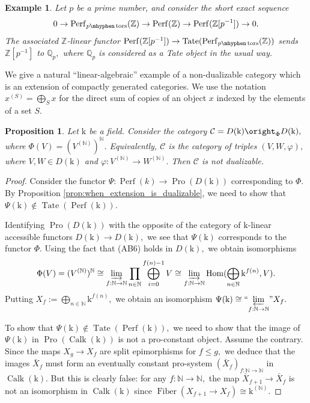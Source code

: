 \documentclass[11pt,leqno]{amsart}
\newtheorem{prop}[theo]{Proposition}
\newtheorem{example}[theo]{Example}
\numberwithin{equation}{section}
\def\N{\mathbb{N}}
\def\Z{\mathbb{Z}}
\def\Q{\mathbb{Q}}
\def\Hom{\operatorname{Hom}}
\newcommand{\hy}{\mhyphen}
\newcommand{\indlim}[1][]{\mathop{\varinjlim}\limits_{#1}}
\newcommand{\prolim}[1][]{\mathop{\varprojlim}\limits_{#1}}
\newcommand{\proolim}[1][]{{``{\prolim[#1]}"}}
\newcommand{\prodd}[1][]{\mathop{\prod}\limits_{#1}}
\newcommand{\Tate}{\operatorname{Tate}}
\newcommand{\Fiber}{\operatorname{Fiber}}
\newcommand{\mk}{\mathrm k}
\newcommand{\cC}{{\mathcal C}}
\newcommand{\Perf}{\operatorname{Perf}}
\newcommand{\Pro}{\operatorname{Pro}}
\newcommand{\Calk}{\operatorname{Calk}}
\newcommand{\tors}{\operatorname{tors}}
\begin{document}
\begin{example} Let $p$ be a prime number, and consider the short exact sequence
$$0\to\Perf_{p\hy\tors}(\Z)\to\Perf(\Z)\to\Perf(\Z[p^{-1}])\to 0.$$
The associated $\Z$-linear functor $\Perf(\Z[p^{-1}])\to \Tate(\Perf_{p\hy\tors}(\Z))$ sends $\Z[p^{-1}]$ to $\Q_p,$ where $\Q_p$ is considered as a Tate object in the usual way.\end{example}

We give a natural ``linear-algebraic'' example of a non-dualizable category which is an extension of compactly generated categories. We use the notation $x^{(S)}=\bigoplus\limits_S x$ for the direct sum of copies of an object $x$ indexed by the elements of a set $S.$

\begin{prop}Let $\mk$ be a field. Consider the category $\cC=D(\mk)\oright_{\Phi} D(\mk),$ where $\Phi(V)=(V^{(\N)})^{\N}.$ Equivalently, $\cC$ is the category of triples $(V,W,\varphi),$ where $V,W\in D(\mk)$ and $\varphi:V^{(\N)}\to W^{(\N)}.$ Then $\cC$ is not dualizable.\end{prop}

\begin{proof}Consider the functor $\Psi:\Perf(k)\to\Pro(D(\mk))$ corresponding to $\Phi.$ By Proposition \ref{prop:when_extension_is_dualizable},  we need to show that $\Psi(\mk)\not\in\Tate(\Perf(\mk)).$

Identifying $\Pro(D(\mk))$ with the opposite of the category of $\mk$-linear accessible functors $D(\mk)\to D(\mk),$ we see that $\Psi(\mk)$ corresponds to the functor $\Phi.$ Using the fact that (AB6) holds in $D(\mk),$ we obtain isomorphisms
$$\Phi(V)=(V^{(\N)})^{\N}\cong \indlim[f:\N\to\N] \prodd[n\in\N]\bigoplus\limits_{i=0}^{f(n)-1} V\cong\indlim[f:\N\to\N]\Hom(\bigoplus\limits_{n\in \N}\mk^{f(n)},V).$$
Putting $X_f:=\bigoplus\limits_{n\in \N}\mk^{f(n)},$ we obtain an isomorphism $\Psi(\mk)\cong\proolim[f:\N\to\N] X_f.$

To show that $\Psi(\mk)\not\in\Tate(\Perf(\mk)),$ we need to show that the image of $\Psi(\mk)$ in $\Pro(\Calk(\mk))$ is not a pro-constant object. Assume the contrary. Since the maps $X_g\to X_f$ are split epimorphisms for $f\leq g,$ we deduce that the images $\bar{X}_f$ must form an eventually constant pro-system $(\bar{X}_f)_{f:\N\to\N}$ in $\Calk(\mk).$ But this is clearly false: for any $f:\N\to\N,$ the map $\bar{X}_{f+1}\to \bar{X}_f$ is not an isomorphism in $\Calk(\mk)$ since $\Fiber(X_{f+1}\to X_f)\cong\mk^{(\N)}.$ \end{proof}
\end{document}
